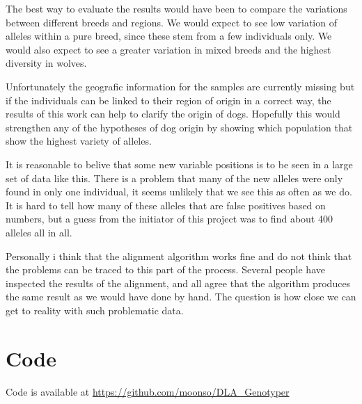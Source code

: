 \documentclass[a4paper,11pt]{kth-mag}
\newcommand{\code}[2]{
  \hrulefill
  \subsection*{#1}
  
  \vspace{2em}
}
\begin{document}
The best way to evaluate the results would have been to compare the variations between different breeds and regions. We would expect to see low variation of alleles within a pure breed, since these stem from a few individuals only. We would also expect to see a greater variation in mixed breeds and the highest diversity in wolves.

Unfortunately the geografic information for the samples are currently missing but if the individuals can be linked to their region of origin in a correct way, the results of this work can help to clarify the origin of dogs. Hopefully this would strengthen any of the hypotheses of dog origin by showing which population that show the highest variety of alleles.

It is reasonable to belive that some new variable positions is to be seen in a large set of data like this. There is a problem that many of the new alleles were only found in only one individual, it seems unlikely that we see this as often as we do. It is hard to tell how many of these alleles that are false positives based on numbers, but a guess from the initiator of this project was to find about 400 alleles all in all.

Personally i think that the alignment algorithm works fine and do not think that the problems can be traced to this part of the process. Several people have inspected the results of the alignment, and all agree that the algorithm produces the same result as we would have done by hand. The question is how close we can get to reality with such problematic data.





% 


\appendix
\renewcommand\thechapter{}
\renewcommand\thesection{\arabic{section}}
\chapter{Code}


Code is available at \url{https://github.com/moonso/DLA_Genotyper}


% 
% 
{}

\end{document}
